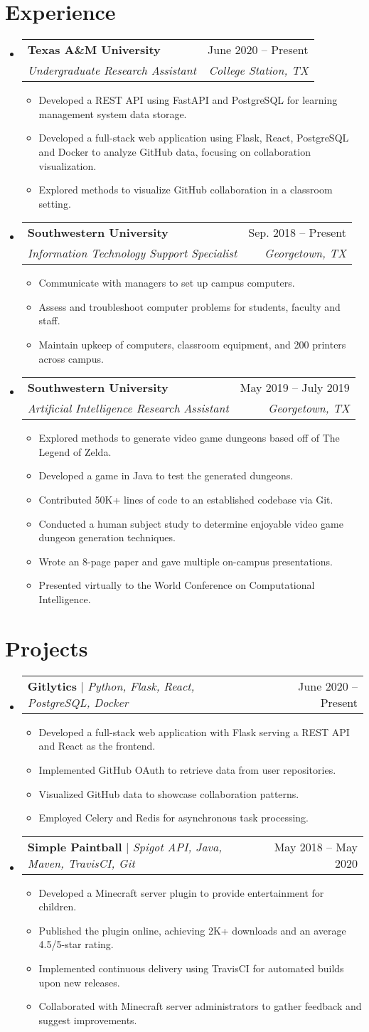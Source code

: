 \documentclass[letterpaper,11pt]{article}
\makeatletter
\newcommand{\resumeItem}[1]{
\item\small{
{#1 \vspace{-2pt}}
}
}
\newcommand{\resumeSubheading}[4]{
\vspace{-2pt}\item
\begin{tabular*}{0.97\textwidth}[t]{l@{\extracolsep{\fill}}r}
\textbf{#1} & #2 \\
\textit{\small#3} & \textit{\small #4} \\
\end{tabular*}\vspace{-7pt}
}
\newcommand{\resumeProjectHeading}[2]{
\item
\begin{tabular*}{0.97\textwidth}{l@{\extracolsep{\fill}}r}
\small#1 & #2 \\
\end{tabular*}\vspace{-7pt}
}
\newcommand{\resumeSubHeadingListStart}{\begin{itemize}[leftmargin=0.15in, label={}]}
\newcommand{\resumeSubHeadingListEnd}{\end{itemize}}
\newcommand{\resumeItemListStart}{\begin{itemize}}
\newcommand{\resumeItemListEnd}{\end{itemize}\vspace{-5pt}}
\makeatother
\begin{document}
\section{Experience}
\resumeSubHeadingListStart
\resumeSubheading{Texas A\&M University}{June 2020 – Present}{Undergraduate Research Assistant}{College Station, TX}
\resumeItemListStart
\resumeItem{Developed a REST API using FastAPI and PostgreSQL for learning management system data storage.}
\resumeItem{Developed a full-stack web application using Flask, React, PostgreSQL and Docker to analyze GitHub data, focusing on collaboration visualization.}
\resumeItem{Explored methods to visualize GitHub collaboration in a classroom setting.}
\resumeItemListEnd
\resumeSubheading{Southwestern University}{Sep. 2018 – Present}{Information Technology Support Specialist}{Georgetown, TX}
\resumeItemListStart
\resumeItem{Communicate with managers to set up campus computers.}
\resumeItem{Assess and troubleshoot computer problems for students, faculty and staff.}
\resumeItem{Maintain upkeep of computers, classroom equipment, and 200 printers across campus.}
\resumeItemListEnd
\resumeSubheading{Southwestern University}{May 2019 – July 2019}{Artificial Intelligence Research Assistant}{Georgetown, TX}
\resumeItemListStart
\resumeItem{Explored methods to generate video game dungeons based off of The Legend of Zelda.}
\resumeItem{Developed a game in Java to test the generated dungeons.}
\resumeItem{Contributed 50K+ lines of code to an established codebase via Git.}
\resumeItem{Conducted a human subject study to determine enjoyable video game dungeon generation techniques.}
\resumeItem{Wrote an 8-page paper and gave multiple on-campus presentations.}
\resumeItem{Presented virtually to the World Conference on Computational Intelligence.}
\resumeItemListEnd
\resumeSubHeadingListEnd

\section{Projects}
\resumeSubHeadingListStart
\resumeProjectHeading{\textbf{Gitlytics} $|$ \emph{Python, Flask, React, PostgreSQL, Docker}}{June 2020 – Present}
\resumeItemListStart
\resumeItem{Developed a full-stack web application with Flask serving a REST API and React as the frontend.}
\resumeItem{Implemented GitHub OAuth to retrieve data from user repositories.}
\resumeItem{Visualized GitHub data to showcase collaboration patterns.}
\resumeItem{Employed Celery and Redis for asynchronous task processing.}
\resumeItemListEnd
\resumeProjectHeading{\textbf{Simple Paintball} $|$ \emph{Spigot API, Java, Maven, TravisCI, Git}}{May 2018 – May 2020}
\resumeItemListStart
\resumeItem{Developed a Minecraft server plugin to provide entertainment for children.}
\resumeItem{Published the plugin online, achieving 2K+ downloads and an average 4.5/5-star rating.}
\resumeItem{Implemented continuous delivery using TravisCI for automated builds upon new releases.}
\resumeItem{Collaborated with Minecraft server administrators to gather feedback and suggest improvements.}
\resumeItemListEnd
\resumeSubHeadingListEnd
\end{document}
